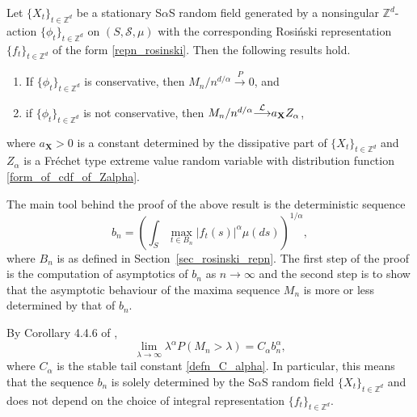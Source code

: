 \documentclass[12pt]{amsart}
\begin{document}
\begin{thm} \label{thm_M_n_cons_diss} Let ${\{X_t\}_{t \in \mathbb{Z}^d}}$ be a stationary S$\alpha$S random field generated by a nonsingular ${\mathbb{Z}^d}$-action ${\{\phi_t\}_{t \in \mathbb{Z}^d}}$ on $(S, \mathcal{S},\mu)$ with the corresponding Rosi\'{n}ski representation $\{f_t\}_{t \in {\mathbb{Z}^d}}$ of the form \eqref{repn_rosinski}. Then the following results hold.
\begin{enumerate}
\item If ${\{\phi_t\}_{t \in \mathbb{Z}^d}}$ is conservative, then $M_n / n^{d/\alpha} {\stackrel{P}{\longrightarrow}} 0$, and
\item if ${\{\phi_t\}_{t \in \mathbb{Z}^d}}$ is not conservative, then $M_n / n^{d/\alpha} {\stackrel{\footnotesize{\mathcal{L}}}{\longrightarrow}} a_{\mathbf{X}} Z_\alpha$,
\end{enumerate}
where $a_{\mathbf{X}} >0$ is a constant determined by the dissipative part of ${\{X_t\}_{t \in \mathbb{Z}^d}}$ and $Z_\alpha$ is a Fr\'{e}chet type extreme value random variable with distribution function \eqref{form_of_cdf_of_Zalpha}.
\end{thm}

The main tool behind the proof of the above result is the deterministic sequence
\begin{equation}
b_n = \left(\int_S \max_{t \in B_n}|f_t(s)|^\alpha \mu(ds)\right)^{1/\alpha}, \label{defn_bn}
\end{equation}
where $B_n$ is as defined in Section~\ref{sec_rosinski_repn}. The first step of the proof is the computation of asymptotics of $b_n$ as $n \to \infty$ and the second step is to show that the asymptotic behaviour of the maxima sequence $M_n$ is more or less determined by that of $b_n$.

\begin{remark} \label{remark_bn_ind_of_repn} \textnormal{By Corollary 4.4.6 of \cite{samorodnitsky:taqqu:1994},}
\begin{equation}
\lim_{\lambda \to \infty} \lambda^\alpha P(M_n > \lambda) = C_\alpha b_n^\alpha, \nonumber
\end{equation}
\textnormal{where $C_\alpha$ is the stable tail constant \eqref{defn_C_alpha}. In particular, this means that the sequence $b_n$ is solely determined by the S$\alpha$S random field ${\{X_t\}_{t \in \mathbb{Z}^d}}$ and does not depend on the choice of integral representation $\{f_t\}_{t\in{\mathbb{Z}^d}}$.}
\end{remark}
\end{document}

